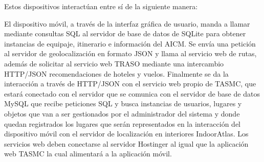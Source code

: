 Estos dispositivos interactúan entre sí de la siguiente manera:

El dispositivo móvil, a través de la interfaz gráfica de usuario, manda a llamar mediante consultas SQL al servidor de base de datos de SQLite para obtener instancias de equipaje, itinerario e información del AICM. Se envía una petición al servidor de geolocalización en formato JSON y llama al servicio web de rutas, además de solicitar al servicio web TRASO mediante una intercambio HTTP/JSON recomendaciones de hoteles y vuelos. Finalmente se da la interacción a través de HTTP/JSON con el servicio web propio de TASMC, que estará conectado con el servidor que se comunica con el servidor de base de datos MySQL que recibe peticiones SQL y busca instancias de usuarios, lugares y objetos que van a ser gestionados por el administrador del sistema y donde quedan registrados los lugares que serán representados en la interacción del dispositivo móvil con el servidor de localización en interiores IndoorAtlas. Los servicios web deben conectarse al servidor Hostinger al igual que la aplicación web TASMC la cual alimentará a la aplicación móvil.